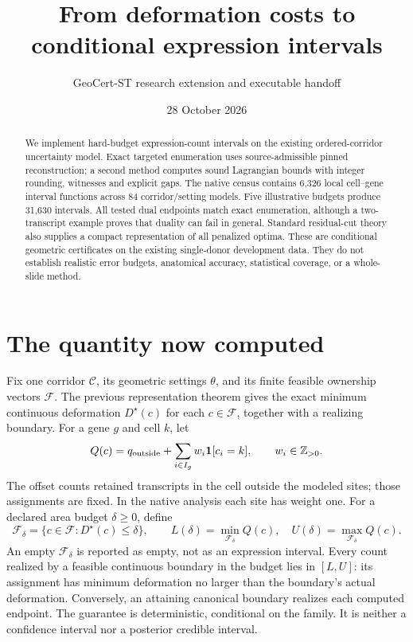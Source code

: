\documentclass[11pt,letterpaper]{article}
\title{From deformation costs to conditional expression intervals}
\author{GeoCert-ST research extension and executable handoff}
\date{28 October 2026}
\newcommand{\D}{D^\star}
\begin{document}
\maketitle
\begin{abstract}
We implement hard-budget expression-count intervals on the existing ordered-corridor uncertainty model. Exact targeted enumeration uses source-admissible pinned reconstruction; a second method computes sound Lagrangian bounds with integer rounding, witnesses and explicit gaps. The native census contains 6,326 local cell--gene interval functions across 84 corridor/setting models. Five illustrative budgets produce 31,630 intervals. All tested dual endpoints match exact enumeration, although a two-transcript example proves that duality can fail in general. Standard residual-cut theory also supplies a compact representation of all penalized optima. These are conditional geometric certificates on the existing single-donor development data. They do not establish realistic error budgets, anatomical accuracy, statistical coverage, or a whole-slide method.
\end{abstract}

\section{The quantity now computed}
Fix one corridor $\mathcal C$, its geometric settings $\theta$, and its finite feasible ownership vectors $\mathcal F$. The previous representation theorem gives the exact minimum continuous deformation $\D(c)$ for each $c\in\mathcal F$, together with a realizing boundary. For a gene $g$ and cell $k$, let
\[
 Q(c)=q_{\rm outside}+\sum_{i\in I_g} w_i\mathbf1[c_i=k],\qquad w_i\in\mathbb Z_{>0}.
\]
The offset counts retained transcripts in the cell outside the modeled sites; those assignments are fixed. In the native analysis each site has weight one. For a declared area budget $\delta\ge0$, define
\[
 \mathcal F_\delta=\{c\in\mathcal F:\D(c)\le\delta\},\qquad
 L(\delta)=\min_{\mathcal F_\delta} Q(c),\quad U(\delta)=\max_{\mathcal F_\delta} Q(c).
\]
An empty $\mathcal F_\delta$ is reported as empty, not as an expression interval. Every count realized by a feasible continuous boundary in the budget lies in $[L,U]$: its assignment has minimum deformation no larger than the boundary's actual deformation. Conversely, an attaining canonical boundary realizes each computed endpoint. The guarantee is deterministic, conditional on the family. It is neither a confidence interval nor a posterior credible interval.
\end{document}

